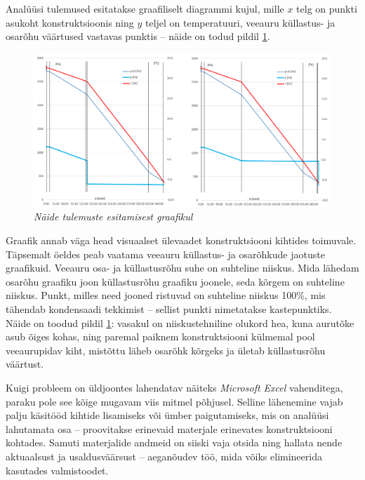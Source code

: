 Analüüsi tulemused esitatakse graafiliselt diagrammi kujul, mille \begin{math}x\end{math} telg on 
punkti asukoht konstruktsioonis ning \begin{math}y\end{math} teljel on temperatuuri, veeauru küllastus- ja
osarõhu väärtused vastavas punktis -- näide on todud pildil  \ref{fig:excel_graph_sample}.

\begin{figure}[ht]
    \centering
    \includegraphics[width=.8\textwidth]{figures/problem_statement/05_excel_grafic_sample.png}
    \caption[Näide niiskustehnilise analüüsi tulemuste esitamisest graafikul]{\textit{Näide tulemuste esitamisest graafikul}}
    \label{fig:excel_graph_sample}
\end{figure}

Graafik annab väga head visuaalset ülevaadet konstruktsiooni kihtides toimuvale. Täpsemalt öeldes peab vaatama 
veeauru küllastus- ja osarõhkude jaotuste graafikuid. Veeauru osa- ja küllastusrõhu suhe on suhteline niiskus. 
Mida lähedam osarõhu graafiku joon küllastusrõhu graafiku joonele, seda kõrgem on suhteline niiskus. Punkt, milles
need jooned ristuvad on suhteline niiskus 100\%, mis tähendab kondensaadi tekkimist --  sellist punkti nimetatakse kastepunktiks.
Näide on toodud pildil \ref{fig:excel_graph_sample}: vasakul on niiskustehniline olukord hea, kuna aurutõke asub õiges kohas, ning paremal
paiknem konstruktsiooni külmemal pool veeaurupidav kiht, mistõttu läheb osarõhk kõrgeks ja ületab küllastusrõhu väärtust.

Kuigi probleem on üldjoontes lahendatav näiteks \textit{Microsoft Excel} vahenditega, paraku pole see kõige mugavam viis
mitmel põhjusel. Selline lähenemine vajab palju käsitööd kihtide lisamiseks või ümber paigutamiseks, mis on analüüsi lahutamata
osa -- proovitakse erinevaid materjale erinevates konstruktsiooni kohtades. Samuti materjalide andmeid on siiski vaja otsida 
ning hallata nende aktuaalsust ja usaldusväärsust -- aeganõudev töö, mida võiks elimineerida kasutades valmistoodet.


